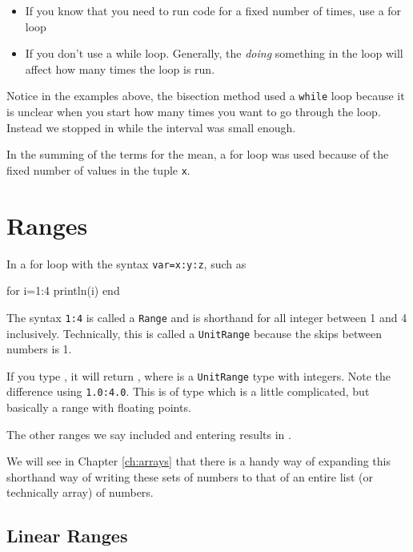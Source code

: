 \begin{itemize}
\item If you know that you need to run code for a fixed number of times, use a for loop
\item If you don't use a while loop. Generally, the \emph{doing} something in the loop will affect how many times the loop is run.
\end{itemize}

Notice in the examples above, the bisection method used a \texttt{while} loop because it is unclear when you start how many times you want to go through the loop.  Instead we stopped in while the interval was small enough.  

In the summing of the terms for the mean, a for loop was used because of the fixed number of values in the tuple \texttt{x}.  


\section{Ranges}

In a for loop with the syntax \texttt{var=x:y:z}, such as 
%
\begin{jlblock}[bool]
for i=1:4
  println(i)
end
\end{jlblock}
%
The syntax \texttt{1:4} is called a \texttt{Range} and is shorthand for all integer between 1 and 4 inclusively. Technically, this is called a \texttt{UnitRange} because
the skips between numbers is 1.

If you type , it will return \printpythontex[verb], where is a \texttt{UnitRange} type
with integers. Note the difference using \texttt{1.0:4.0}.  This is of type
 \printpythontex[verbatim]
 which is a little complicated, but basically a range with floating points.  

The other ranges we say included  and entering  results in \printpythontex[verb]. 

We will see in Chapter \ref{ch:arrays} that there is a handy way of expanding this shorthand way of writing these sets of numbers to that of an entire list (or technically array) of numbers.  

\subsection{Linear Ranges} \label{sect:lin:range}

